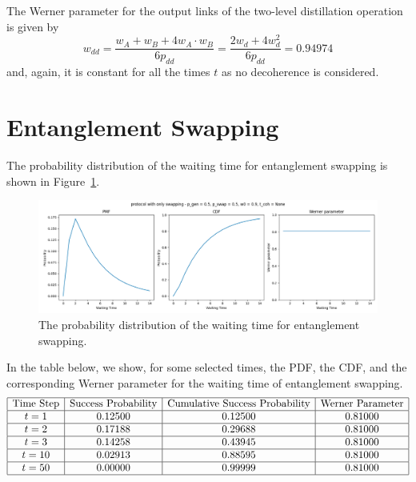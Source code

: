 \documentclass{masterthesis}
\begin{document}
The Werner parameter for the output links of the two-level distillation operation is given by
\begin{equation}
    w_{dd} = \frac{w_A + w_B + 4 w_A \cdot w_B}{6 p_{dd}} = \frac{2 w_d + 4 w_d^2}{6 p_{dd}} = 0.94974
\end{equation}
and, again, it is constant for all the times $t$ as no decoherence is considered.

\section{Entanglement Swapping}\label{section:entanglement_swapping_numerical_example}

The probability distribution of the waiting time for entanglement swapping is shown in Figure~\ref{fig:swap_waiting_time}.
\begin{figure}[ht]
    \centering
    \includegraphics[width=1\linewidth]{images/dist_tests/only swapping.png}
    \caption{The probability distribution of the waiting time for entanglement swapping.}
    \label{fig:swap_waiting_time}
\end{figure}

In the table below, we show, for some selected times, the PDF, the CDF, and the corresponding Werner parameter for the waiting time of entanglement swapping.
\begin{equation*}
    \begin{array}{|c|c|c|c|}
        \hline
        \text{Time Step} & \text{Success Probability} & \text{Cumulative Success Probability} & \text{Werner Parameter} \\
        \hline
        t = 1 & 0.12500 & 0.12500 & 0.81000 \\
        \hline
        t = 2 & 0.17188 & 0.29688 & 0.81000 \\
        \hline
        t = 3 & 0.14258 & 0.43945 & 0.81000 \\
        \hline
        t = 10 & 0.02913 & 0.88595 & 0.81000 \\
        \hline
        t = 50 & 0.00000 & 0.99999 & 0.81000 \\
        \hline
    \end{array}
\end{equation*}


{\raggedright\printbibliography}
\end{document}
